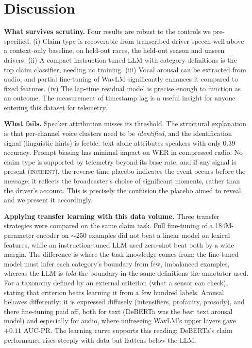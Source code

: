 \section{Discussion}
\label{sec:discussion}

\textbf{What survives scrutiny.} Four results are robust to the controls we pre-specified. (i) Claim type is recoverable from transcribed driver speech well above a context-only baseline, on held-out races, the held-out season and unseen drivers. (ii) A compact instruction-tuned LLM with category definitions is the top claim classifier, needing no training. (iii) Vocal arousal can be extracted from audio, and partial fine-tuning of WavLM significantly enhances it compared to fixed features. (iv) The lap-time residual model is precise enough to function as an outcome. The measurement of timestamp lag is a useful insight for anyone entering this dataset for telemetry.

\textbf{What fails.} Speaker attribution misses its threshold. The structural explanation is that per-channel voice clusters need to be \emph{identified}, and the identification signal (linguistic hints) is feeble: text alone attributes speakers with only 0.39 accuracy. Prompt biasing has minimal impact on WER in compressed radio. No claim type is supported by telemetry beyond its base rate, and if any signal is present (\textsc{incident}), the reverse-time placebo indicates the event occurs before the message: it reflects the broadcaster's choice of significant moments, rather than the driver's account. This is precisely the confusion the placebo aimed to reveal, and we present it accordingly.

\textbf{Applying transfer learning with this data volume.} Three transfer strategies were compared on the same claim task. Full fine-tuning of a 184M-parameter encoder on $\sim$250 examples did not beat a linear model on lexical features, while an instruction-tuned LLM used zero-shot beat both by a wide margin. The difference is where the task knowledge comes from: the fine-tuned model must infer each category's boundary from few, imbalanced examples, whereas the LLM is \emph{told} the boundary in the same definitions the annotator used. For a taxonomy defined by an external criterion (what a sensor can check), stating that criterion beats learning it from a few hundred labels. Arousal behaves differently: it is expressed diffusely (intensifiers, profanity, prosody), and there fine-tuning paid off, both for text (DeBERTa was the best text arousal model) and especially for audio, where unfreezing WavLM's upper layers gave $+0.11$ AUC-PR. The learning curve supports this reading: DeBERTa's claim performance rises steeply with data but flattens below the LLM.

